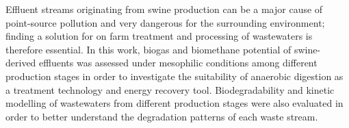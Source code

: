 Effluent streams originating from swine production can be a major cause of point-source pollution and very dangerous for the surrounding environment; finding a solution for on farm treatment and processing of wastewaters is therefore essential. In this work, biogas and biomethane potential of swine-derived effluents was assessed under mesophilic conditions among different production stages in order to investigate the suitability of anaerobic digestion as a treatment technology and energy recovery tool. Biodegradability and kinetic modelling of wastewaters from different production stages were also evaluated in order to better understand the degradation patterns of each waste stream.